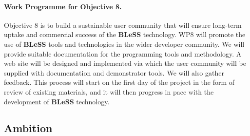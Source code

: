 \documentclass[a4paper,11pt]{article}
\newcommand{\project}[1]{\textbf{#1}\xspace}
\newcommand{\BLESS}{\project{BLeSS}}
\newcommand{\TheProject}{\BLESS}
\begin{document}
\paragraph*{Work Programme for Objective 8.}

 Objective 8 is to build a sustainable user community that will ensure long-term
 uptake and commercial success of the \TheProject technology. WP8 will promote
 the use of \TheProject tools and technologies in the wider developer community.
 We will provide suitable documentation for the programming tools and methodology.
 A web site will be
 designed and implemented via which the user community will be
 supplied with documentation and demonstrator tools. We will also gather feedback.
 This process will start on the first day of
 the project in the form of review of existing materials, and
 it will then progress in pace with the development of \TheProject{} technology.




\draftpage
\subsection{Ambition}

\end{document}
